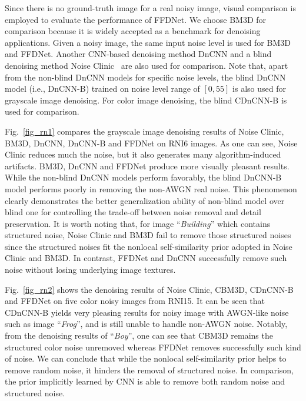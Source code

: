 \documentclass[journal]{IEEEtran}
\begin{document}
Since there is no ground-truth image for a real noisy image, visual comparison is employed to evaluate the performance of FFDNet. We choose BM3D for comparison because it is widely accepted as a benchmark for denoising applications. Given a noisy image, the same input noise level is used for BM3D and FFDNet. Another CNN-based denoising method DnCNN and a blind denoising method Noise Clinic~\cite{lebrun2015noise} are also used for comparison. Note that, apart from the non-blind DnCNN models for specific noise levels, the blind DnCNN model (i.e., DnCNN-B) trained on noise level range of $[0, 55]$ is also used for grayscale image denoising. For color image denoising, the blind CDnCNN-B is used for comparison.


Fig.~\ref{fig_rn1} compares the grayscale image denoising results of Noise Clinic, BM3D, DnCNN, DnCNN-B and FFDNet on RNI6 images. As one can see, Noise Clinic reduces much the noise, but it also generates many algorithm-induced artifacts. BM3D, DnCNN and FFDNet produce more visually pleasant results.
While the non-blind DnCNN models perform favorably, the blind DnCNN-B model performs poorly in removing the non-AWGN real noise. This phenomenon clearly demonstrates the better generalization ability of non-blind model over blind one for controlling the trade-off between noise removal and detail preservation.
It is worth noting that, for image ``\emph{Building}'' which contains structured noise, Noise Clinic and BM3D fail to remove those structured noises since the structured noises fit the nonlocal self-similarity prior adopted in Noise Clinic and BM3D. In contrast, FFDNet and DnCNN successfully remove such noise without losing underlying image textures.





Fig.~\ref{fig_rn2} shows the denoising results of Noise Clinic, CBM3D, {CDnCNN-B} and FFDNet on five color noisy images from RNI15.
It can be seen that CDnCNN-B yields very pleasing results for noisy image with AWGN-like noise such as image ``\emph{Frog}'', and is still unable to handle non-AWGN noise.
Notably, from the denoising results of ``\emph{Boy}'', one can see that CBM3D remains the structured color noise unremoved whereas FFDNet removes successfully such kind of noise. We can conclude that while the nonlocal self-similarity prior helps to remove random noise, it hinders the removal of structured noise. In comparison, the prior implicitly learned by CNN is able to remove both random noise and structured noise.
\end{document}
